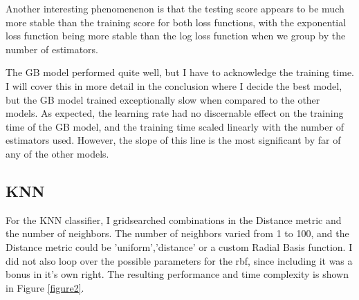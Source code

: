 \documentclass[12pt]{article}
\begin{document}
Another interesting phenomenenon is that the testing score appears to be much more stable than the training score for both
loss functions, with the exponential loss function being more stable than the log loss function when we group by the number 
of estimators. 

The GB model performed quite well, but I have to acknowledge the training time. I will cover this in more detail in the
conclusion where I decide the best model, but the GB model trained exceptionally slow when compared to the other models.
As expected, the learning rate had no discernable effect on the training time of the GB model, and the training time scaled
linearly with the number of estimators used. However, the slope of this line is the most significant by far of any of the 
other models.

\subsection{KNN}
For the KNN classifier, I gridsearched combinations in the Distance metric and the number of neighbors. 
The number of neighbors varied from 1 to 100, and the Distance metric could be 'uniform','distance' or a 
custom Radial Basis function. I did not also loop over the possible parameters for the rbf, since including it was a
bonus in it's own right. The resulting performance and time complexity is shown in Figure \ref{figure2}.
\end{document}
